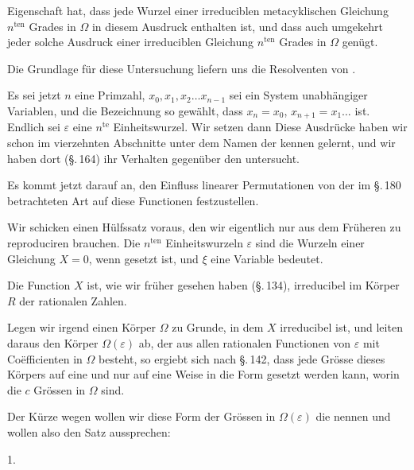 Eigenschaft hat, dass jede Wurzel einer irreduciblen metacyklischen Gleichung $n^{\mathrm{ten}}$ Grades in $\Omega$ in diesem Ausdruck enthalten ist, und dass auch umgekehrt jeder solche Ausdruck einer irreduciblen Gleichung $n^{\mathrm{ten}}$ Grades in $\Omega$ genügt.

Die Grundlage für diese Untersuchung liefern uns die Resolventen von .

Es sei jetzt $n$ eine Primzahl, $x_0, x_1, x_2 \ldots x_{n-1}$ sei ein System unabhängiger Variablen, und die Bezeichnung so gewählt, dass $x_n = x_0$, $x_{n+1} = x_1 \ldots$ ist. Endlich sei $\varepsilon$ eine $n^{\mathrm{te}}$ Einheitswurzel. Wir setzen dann
Diese Ausdrücke haben wir schon im vierzehnten Abschnitte unter dem Namen der  kennen gelernt, und wir haben dort (\S.\,164) ihr Verhalten gegenüber den  untersucht.

Es kommt jetzt darauf an, den Einfluss linearer Permutationen von der im \S.\,180 betrachteten Art auf diese Functionen festzustellen.

Wir schicken einen Hülfssatz voraus, den wir eigentlich nur aus dem Früheren zu reproduciren brauchen. Die  $n^{\mathrm{ten}}$ Einheitswurzeln $\varepsilon$ sind die Wurzeln einer Gleichung $X = 0$, wenn
gesetzt ist, und $\xi$ eine Variable bedeutet.

Die Function $X$ ist, wie wir früher gesehen haben (\S.\,134), irreducibel im Körper $R$ der rationalen Zahlen.

Legen wir irgend einen Körper $\Omega$ zu Grunde, in dem $X$ irreducibel ist, und leiten daraus den Körper $\Omega(\varepsilon)$ ab, der aus allen rationalen Functionen von $\varepsilon$ mit Coëfficienten in $\Omega$ besteht, so ergiebt sich nach \S.\,142, dass jede Grösse dieses Körpers auf eine und nur auf eine Weise in die Form
gesetzt werden kann, worin die $c$ Grössen in $\Omega$ sind.

Der Kürze wegen wollen wir diese Form der Grössen in $\Omega(\varepsilon)$ die  nennen und wollen also den Satz aussprechen:

1. 
